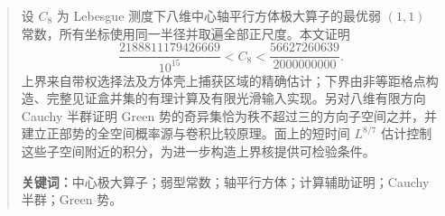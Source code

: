 \begin{abstract}
设 $C_8$ 为 Lebesgue 测度下八维中心轴平行方体极大算子的最优弱 $(1,1)$ 常数，所有坐标使用同一半径并取遍全部正尺度。本文证明
\[
 \frac{2188811179426669}{10^{15}}<C_8<
 \frac{56627260639}{2000000000}.
\]
上界来自带权选择法及方体壳上捕获区域的精确估计；下界由非等距格点构造、完整见证盒并集的有理计算及有限光滑输入实现。另对八维有限方向 Cauchy 半群证明 Green 势的奇异集恰为秩不超过三的方向子空间之并，并建立正部势的全空间概率源与卷积比较原理。面上的短时间 $L^{8/7}$ 估计控制这些子空间附近的积分，为进一步构造上界核提供可检验条件。
\par\smallskip\noindent\textbf{关键词：}中心极大算子；弱型常数；轴平行方体；计算辅助证明；Cauchy 半群；Green 势。
\end{abstract}
